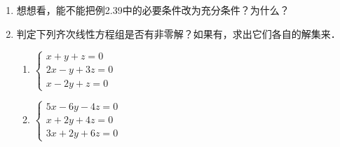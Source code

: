 \begin{ex}
\begin{enumerate}
    \item 想想看，能不能把例2.39中的必要条件改为充分条件？为什么？
    \item 判定下列齐次线性方程组是否有非零解？如果有，求出它们各自的解集来．
    \begin{multicols}{2}
\begin{enumerate}
    \item $\begin{cases}
        x+y+z=0\\2x-y+3z=0\\x-2y+z=0
    \end{cases}$
    \item $\begin{cases}
        5x-6y-4z=0\\x+2y+4z=0\\3x+2y+6z=0
    \end{cases}$
\end{enumerate}        
    \end{multicols}
\end{enumerate}    
\end{ex}

